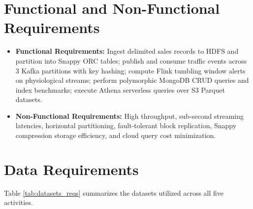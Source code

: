 \documentclass[12pt,a4paper]{report}
\begin{document}
\section{Functional and Non-Functional Requirements}
\begin{itemize}
    \item \textbf{Functional Requirements:} Ingest delimited sales records to HDFS and partition into Snappy ORC tables; publish and consume traffic events across 3 Kafka partitions with key hashing; compute Flink tumbling window alerts on physiological streams; perform polymorphic MongoDB CRUD queries and index benchmarks; execute Athena serverless queries over S3 Parquet datasets.
    \item \textbf{Non-Functional Requirements:} High throughput, sub-second streaming latencies, horizontal partitioning, fault-tolerant block replication, Snappy compression storage efficiency, and cloud query cost minimization.
\end{itemize}

\section{Data Requirements}
Table \ref{tab:datasets_reqs} summarizes the datasets utilized across all five activities.
\end{document}
